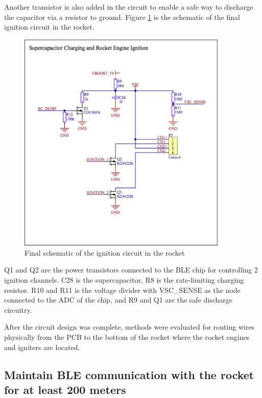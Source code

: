 \documentclass{workreport}
\begin{document}
\begin{body}
	Another transistor is also added in the circuit to enable a safe way to discharge the capacitor via a resistor to ground. Figure \ref{fig:final_ign} is the schematic of the final ignition circuit in the rocket.

	\begin{figure}[!ht]
		\centering
		\includegraphics[width=10cm]{./images/final_ign.png}
		\caption{Final schematic of the ignition circuit in the rocket}
		\label{fig:final_ign}
	\end{figure}

	Q1 and Q2 are the power transistors connected to the BLE chip for controlling 2 ignition channels. C28 is the supercapacitor, R8 is the rate-limiting charging resistor. R10 and R11 is the voltage divider with VSC_SENSE as the node connected to the ADC of the chip, and R9 and Q1 are the safe discharge circuitry.

	After the circuit design was complete, methods were evaluated for routing wires physically from the PCB to the bottom of the rocket where the rocket engines and igniters are located. 

	\subsection{Maintain BLE communication with the rocket for at least 200 meters}


\end{body}
\end{document}
